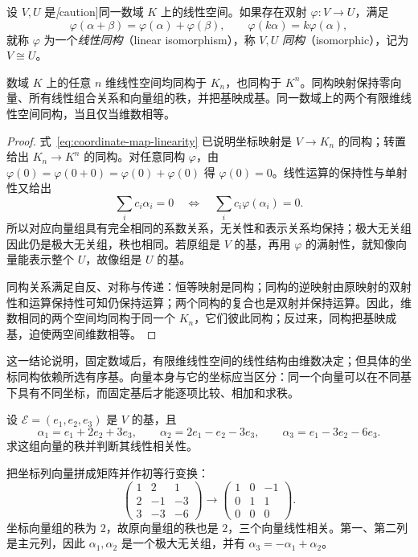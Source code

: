\begin{definition}
\label{def:vector-space-isomorphism}
设 $V,U$ 是\emph[caution]{同一数域 $K$ 上}的线性空间。如果存在双射 $\varphi:V\to U$，满足
\[
    \varphi(\alpha+\beta)=\varphi(\alpha)+\varphi(\beta),\qquad
    \varphi(k\alpha)=k\varphi(\alpha),
\]
就称 $\varphi$ 为一个\emph{线性同构}（linear isomorphism），称 $V,U$ \emph{同构}（isomorphic），记为 $V\cong U$。
\end{definition}

\begin{theorem}
\label{thm:coordinates-and-isomorphism}
数域 $K$ 上的任意 $n$ 维线性空间均同构于 $K_n$，也同构于 $K^n$。同构映射保持零向量、所有线性组合关系和向量组的秩，并把基映成基。同一数域上的两个有限维线性空间同构，当且仅当维数相等。
\end{theorem}

\begin{proof}
式~\eqref{eq:coordinate-map-linearity} 已说明坐标映射是 $V\to K_n$ 的同构；转置给出 $K_n\to K^n$ 的同构。对任意同构 $\varphi$，由 $\varphi(0)=\varphi(0+0)=\varphi(0)+\varphi(0)$ 得 $\varphi(0)=0$。线性运算的保持性与单射性又给出
\[
    \sum_i c_i\alpha_i=0
    \quad\Longleftrightarrow\quad
    \sum_i c_i\varphi(\alpha_i)=0.
\]
所以对应向量组具有完全相同的系数关系，无关性和表示关系均保持；极大无关组因此仍是极大无关组，秩也相同。若原组是 $V$ 的基，再用 $\varphi$ 的满射性，就知像向量能表示整个 $U$，故像组是 $U$ 的基。

同构关系满足自反、对称与传递：恒等映射是同构；同构的逆映射由原映射的双射性和运算保持性可知仍保持运算；两个同构的复合也是双射并保持运算。因此，维数相同的两个空间均同构于同一个 $K_n$，它们彼此同构；反过来，同构把基映成基，迫使两空间维数相等。
\end{proof}

这一结论说明，固定数域后，有限维线性空间的线性结构由维数决定；但具体的坐标同构依赖所选有序基。向量本身与它的坐标应当区分：同一个向量可以在不同基下具有不同坐标，而固定基后才能逐项比较、相加和求秩。

\begin{example}
\label{ex:rank-through-coordinates}
设 $\mathcal E=(e_1,e_2,e_3)$ 是 $V$ 的基，且
\[
    \alpha_1=e_1+2e_2+3e_3,\qquad
    \alpha_2=2e_1-e_2-3e_3,\qquad
    \alpha_3=e_1-3e_2-6e_3.
\]
求这组向量的秩并判断其线性相关性。
\end{example}

\begin{solve}
把坐标列向量拼成矩阵并作初等行变换：
\[
    \begin{pmatrix}1&2&1\\2&-1&-3\\3&-3&-6\end{pmatrix}
    \longrightarrow
    \begin{pmatrix}1&0&-1\\0&1&1\\0&0&0\end{pmatrix}.
\]
坐标向量组的秩为 $2$，故原向量组的秩也是 $2$，三个向量线性相关。第一、第二列是主元列，因此 $\alpha_1,\alpha_2$ 是一个极大无关组，并有 $\alpha_3=-\alpha_1+\alpha_2$。
\end{solve}

